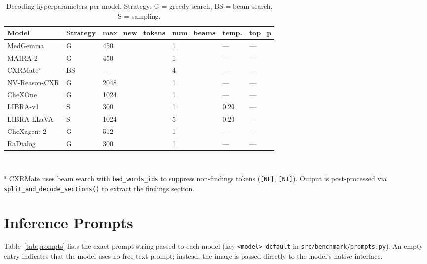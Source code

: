 \documentclass[10pt,a4paper]{article}
\newcommand{\na}{---}
\begin{document}
\begin{table}[ht]
\centering
\caption{Decoding hyperparameters per model. Strategy: G = greedy search,
         BS = beam search, S = sampling.}
\label{tab:decoding}
\small
\begin{tabular}{L{2.4cm} C{1.5cm} C{1.8cm} C{1.6cm} C{1.4cm} C{1.4cm}}
\toprule
\textbf{Model} &
\textbf{Strategy} &
\textbf{max\_new\_tokens} &
\textbf{num\_beams} &
\textbf{temp.} &
\textbf{top\_p} \\
\midrule
MedGemma      & G  & 450   & 1 & \na  & \na  \\
MAIRA-2       & G  & 450   & 1 & \na  & \na  \\
CXRMate$^{a}$ & BS & \na   & 4 & \na  & \na  \\
NV-Reason-CXR & G  & 2048  & 1 & \na  & \na  \\
CheXOne       & G  & 1024  & 1 & \na  & \na  \\
LIBRA-v1      & S  & 300   & 1 & 0.20 & \na  \\
LIBRA-LLaVA   & S  & 1024  & 5 & 0.20 & \na  \\
CheXagent-2   & G  & 512   & 1 & \na  & \na  \\
RaDialog      & G  & 300   & 1 & \na  & \na  \\
\bottomrule
\end{tabular}
\vspace{4pt}\\
\raggedright\small
$^{a}$ CXRMate uses beam search with \texttt{bad\_words\_ids} to suppress
non-findings tokens (\texttt{[NF]}, \texttt{[NI]}).
Output is post-processed via \texttt{split\_and\_decode\_sections()} to
extract the findings section.
\end{table}

\section{Inference Prompts}
\label{sec:prompts}

Table~\ref{tab:prompts} lists the exact prompt string passed to each model
(key \texttt{<model>\_default} in \texttt{src/benchmark/prompts.py}).
An empty entry indicates that the model uses no free-text prompt; instead,
the image is passed directly to the model's native interface.
\end{document}
